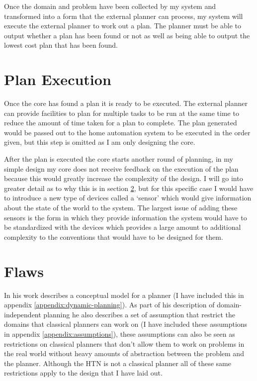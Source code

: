 Once the domain and problem have been collected by my system and transformed
into a form that the external planner can process, my system will execute the
external planner to work out a plan. The planner must be able to output whether
a plan has been found or not as well as being able to output the lowest cost
plan that has been found.

\section{Plan Execution}
Once the core has found a plan it is ready to be executed. The external planner
can provide facilities to plan for multiple tasks to be run at the same time to
reduce the amount of time taken for a plan to complete. The plan generated would
be passed out to the home automation system to be executed in the order given,
but this step is omitted as I am only designing the core.

After the plan is executed the core starts another round of planning, in my
simple design my core does not receive feedback on the execution of the plan
because this would greatly increase the complexity of the design. I will go into
greater detail as to why this is in section \ref{section:flaws}, but for this
specific case I would have to introduce a new type of devices called a `sensor'
which would give information about the state of the world to the system. The
largest issue of adding these sensors is the form in which they provide
information the system would have to be standardized with the devices which
provides a large amount to additional complexity to the conventions that would
have to be designed for them.

\section{Flaws}
\label{section:flaws}
In his work \cite{Nau2007} describes a conceptual model for a planner (I have
included this in appendix \ref{appendix:dynamic-planning}). As part of his
description of domain-independent planning he also describes a set of assumption
that restrict the domains that classical planners can work on (I have included
these assumptions in appendix \ref{appendix:assumptions}), these assumptions can
also be seen as restrictions on classical planners that don't allow them to work
on problems in the real world without heavy amounts of abstraction between the
problem and the planner. Although the HTN is not a classical planner all of
these same restrictions apply to the design that I have laid out.


